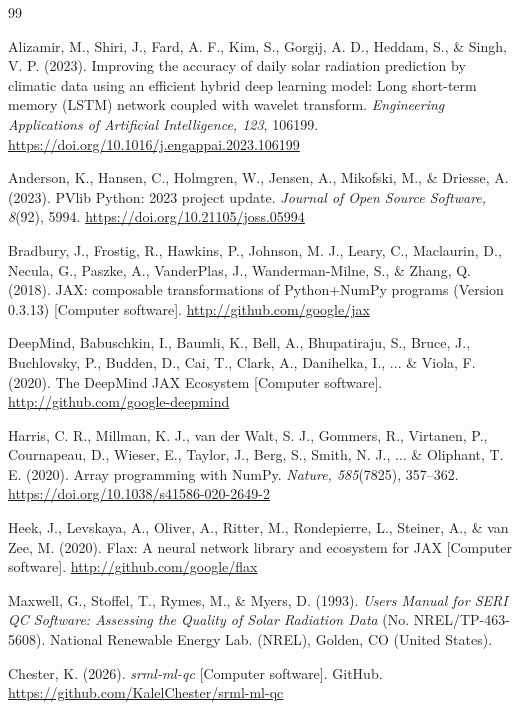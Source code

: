 \documentclass[12pt]{article}
\begin{document}
\begin{thebibliography}{99}

Alizamir, M., Shiri, J., Fard, A. F., Kim, S., Gorgij, A. D., Heddam, S., \& Singh, V. P. (2023). Improving the accuracy of daily solar radiation prediction by climatic data using an efficient hybrid deep learning model: Long short-term memory (LSTM) network coupled with wavelet transform. \textit{Engineering Applications of Artificial Intelligence, 123}, 106199. \url{https://doi.org/10.1016/j.engappai.2023.106199}

Anderson, K., Hansen, C., Holmgren, W., Jensen, A., Mikofski, M., \& Driesse, A. (2023). PVlib Python: 2023 project update. \textit{Journal of Open Source Software, 8}(92), 5994. \url{https://doi.org/10.21105/joss.05994}

Bradbury, J., Frostig, R., Hawkins, P., Johnson, M. J., Leary, C., Maclaurin, D., Necula, G., Paszke, A., VanderPlas, J., Wanderman-Milne, S., \& Zhang, Q. (2018). JAX: composable transformations of Python+NumPy programs (Version 0.3.13) [Computer software]. \url{http://github.com/google/jax}

DeepMind, Babuschkin, I., Baumli, K., Bell, A., Bhupatiraju, S., Bruce, J., Buchlovsky, P., Budden, D., Cai, T., Clark, A., Danihelka, I., ... \& Viola, F. (2020). The DeepMind JAX Ecosystem [Computer software]. \url{http://github.com/google-deepmind}

Harris, C. R., Millman, K. J., van der Walt, S. J., Gommers, R., Virtanen, P., Cournapeau, D., Wieser, E., Taylor, J., Berg, S., Smith, N. J., ... \& Oliphant, T. E. (2020). Array programming with NumPy. \textit{Nature, 585}(7825), 357--362. \url{https://doi.org/10.1038/s41586-020-2649-2}

Heek, J., Levskaya, A., Oliver, A., Ritter, M., Rondepierre, L., Steiner, A., \& van Zee, M. (2020). Flax: A neural network library and ecosystem for JAX [Computer software]. \url{http://github.com/google/flax}

Maxwell, G., Stoffel, T., Rymes, M., \& Myers, D. (1993). \textit{Users Manual for SERI QC Software: Assessing the Quality of Solar Radiation Data} (No. NREL/TP-463-5608). National Renewable Energy Lab. (NREL), Golden, CO (United States).

Chester, K. (2026). \textit{srml-ml-qc} [Computer software]. GitHub. \url{https://github.com/KalelChester/srml-ml-qc}


\end{thebibliography}
\end{document}
